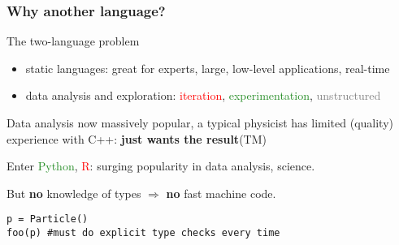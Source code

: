 \documentclass[16pt]{beamer}
\begin{document}
\begin{frame}[fragile]
\vspace{0.5cm}
\frametitle{Why another language?}

The two-language problem
\begin{itemize}
\item static languages: great for experts, large, low-level applications, real-time
\item data analysis and exploration: \textcolor{red}{iteration}, \textcolor{ForestGreen}{experimentation}, \textcolor{gray}{unstructured}
\end{itemize}

\begin{center}
Data analysis now massively popular, a typical physicist has limited (quality) experience with C++: \textbf{just wants the result}(TM)
\end{center}

\begin{center}
Enter \textcolor{ForestGreen}{Python}, \textcolor{red}{R}: surging popularity in data analysis, science.
\end{center}

But \textbf{no} knowledge of types $\Rightarrow$ \textbf{no} fast machine code.
\begin{lstlisting}
p = Particle()
foo(p) #must do explicit type checks every time
\end{lstlisting}



\end{frame}
\end{document}

